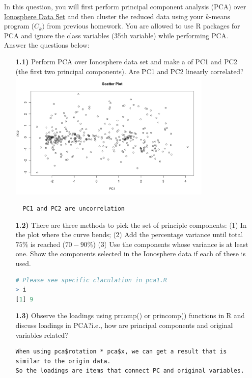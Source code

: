 \documentclass{article}
\begin{document}
In this question, you will first perform principal component analysis (PCA) over  \href{https://archive.ics.uci.edu/ml/datasets/ionosphere}{
Ionosphere Data Set} and then cluster the  reduced data using your $k$-means program ($C_k)$ from previous homework. You are allowed to use R packages for PCA and ignore the class variables (35th variable) while performing PCA. Answer the questions below:
 \\
  \begin{enumerate}
  \item[\textbf{1.1)}] Perform PCA over Ionosphere data set and make a of PC1 and PC2 (the first two principal components). Are PC1 and PC2 linearly correlated?  
 \\
  \includegraphics[width=10cm]{1-1-prcomp.png}
  \begin{verbatim}
  PC1 and PC2 are uncorrelation
  \end{verbatim}
\pagebreak

  \item[\textbf{1.2)}]  There are three methods to pick the set of principle components: (1) In the plot where the curve bends; (2)
Add the percentage variance until total $75\%$ is reached ($70-90\%$) (3) Use the components whose variance
is at least one. Show the components selected in the Ionosphere data  if each of these is used.
\\

\begin{lstlisting}[language = R]
# Please see specific claculation in pca1.R
> i
[1] 9
\end{lstlisting}

  \item[\textbf{1.3)}]  Observe the loadings using prcomp() or princomp() functions in R and  discuss loadings in PCA?i.e., how are principal components and original variables related?
\\
\begin{verbatim}
When using pca$rotation * pca$x, we can get a result that is similar to the origin data. 
So the loadings are items that connect PC and original variables.
\end{verbatim}



\end{enumerate}
\end{document}
